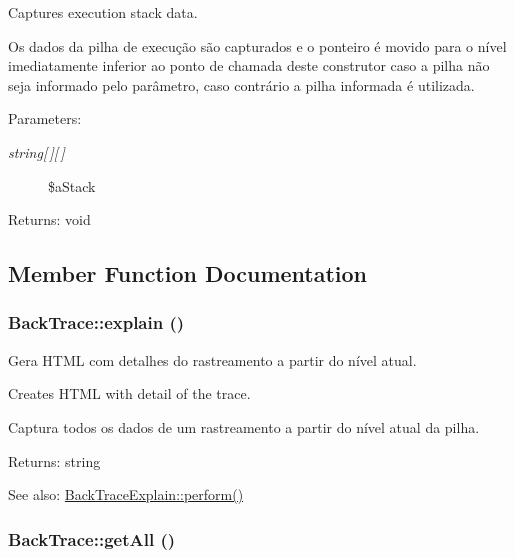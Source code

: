 Captures execution stack data.

Os dados da pilha de execução são capturados e o ponteiro é movido para o nível imediatamente inferior ao ponto de chamada deste construtor caso a pilha não seja informado pelo parâmetro, caso contrário a pilha informada é utilizada.

\begin{Desc}
\item[Parameters:]
\begin{description}
\item[{\em string\mbox{[}$\,$\mbox{]}\mbox{[}$\,$\mbox{]}}]\$aStack \end{description}
\end{Desc}
\begin{Desc}
\item[Returns:]void \end{Desc}


\subsection{Member Function Documentation}
\hypertarget{class_back_trace_4396a5a1722ae78fecd33df4f6cdd711}{
\subsubsection[{explain}]{\setlength{\rightskip}{0pt plus 5cm}BackTrace::explain ()}}
\label{class_back_trace_4396a5a1722ae78fecd33df4f6cdd711}


Gera HTML com detalhes do rastreamento a partir do nível atual.

Creates HTML with detail of the trace.

Captura todos os dados de um rastreamento a partir do nível atual da pilha.

\begin{Desc}
\item[Returns:]string \end{Desc}
\begin{Desc}
\item[See also:]\hyperlink{class_back_trace_explain_7c43123f132faff85e225130dcdff9ec}{BackTraceExplain::perform()} \end{Desc}
\hypertarget{class_back_trace_9e5ff1a07decb6421c875cec34eaae40}{
\subsubsection[{getAll}]{\setlength{\rightskip}{0pt plus 5cm}BackTrace::getAll ()}}
\label{class_back_trace_9e5ff1a07decb6421c875cec34eaae40}



